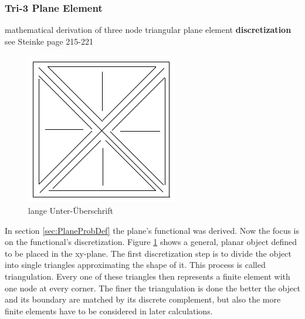 \documentclass[11pt,twoside]{scrartcl}
\begin{document}
  \subsubsection{Tri-3 Plane Element}
  mathematical derivation of three node triangular plane element \textbf{discretization}\\
  see Steinke \cite{steinke2005finite} page 215-221\\
  \begin{figure}
  	\centering
  	\includegraphics[width=0.7\linewidth]{figures/platzhalter}
  	\caption[kurze Unter-Überschrift]{lange Unter-Überschrift}
  	\label{fig:platzhalter}
  \end{figure}
  In section \ref{sec:PlaneProbDef} the plane's functional was derived. Now the focus is on the functional's discretization. Figure \ref{fig:platzhalter} shows a general, planar object defined to be placed in the xy-plane. The first discretization step is to divide the object into single triangles approximating the shape of it. This process is called triangulation. Every one of these triangles then represents a finite element with one node at every corner. The finer the triangulation is done the better the object and its boundary are matched by its discrete complement, but also the more finite elements have to be considered in later calculations.
\end{document}
